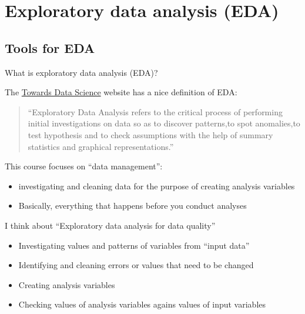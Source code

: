 \documentclass[8pt,ignorenonframetext,dvipsnames]{beamer}
\providecommand{\tightlist}{%
  \setlength{\itemsep}{0pt}\setlength{\parskip}{0pt}}
\begin{document}
\section{Exploratory data analysis
(EDA)}\label{exploratory-data-analysis-eda}

\subsection{Tools for EDA}\label{tools-for-eda}

\begin{frame}{What is exploratory data analysis (EDA)?}

The
\href{https://towardsdatascience.com/exploratory-data-analysis-8fc1cb20fd15}{Towards
Data Science} website has a nice definition of EDA:

\begin{quote}
``Exploratory Data Analysis refers to the critical process of performing
initial investigations on data so as to discover patterns,to spot
anomalies,to test hypothesis and to check assumptions with the help of
summary statistics and graphical representations.''
\end{quote}

This course focuses on ``data management'':

\begin{itemize}
\tightlist
\item
  investigating and cleaning data for the purpose of creating analysis
  variables
\item
  Basically, everything that happens before you conduct analyses
\end{itemize}

I think about ``Exploratory data analysis for data quality''

\begin{itemize}
\tightlist
\item
  Investigating values and patterns of variables from ``input data''
\item
  Identifying and cleaning errors or values that need to be changed
\item
  Creating analysis variables
\item
  Checking values of analysis variables agains values of input variables
\end{itemize}

\end{frame}
\end{document}
